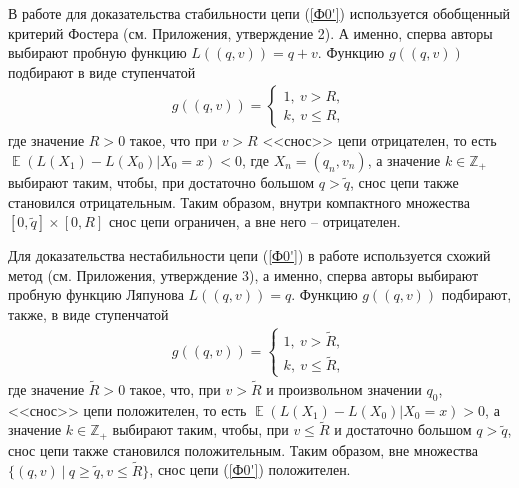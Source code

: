 \documentclass[10pt, reqno]{amsart}
\DeclareMathOperator*{\E}{\mathbb{E}}
\begin{document}
В работе \cite{Foss_original} для доказательства стабильности цепи (\ref{Ф0'}) используется обобщенный критерий Фостера (см. Приложения, утверждение 2). А именно, сперва авторы выбирают пробную функцию $L((q, v)) = q + v$. Функцию $g((q, v))$ подбирают в виде ступенчатой
\begin{align}
    g((q, v)) = \begin{cases}
    1,\: v > R,\\
    k,\: v \leq R,
    \end{cases}
    \label{step_function_g_stab}
\end{align}
где значение $R > 0$ такое, что при $v > R$ <<снос>> цепи отрицателен, то есть $\E(L(X_{1}) − L(X_{0}) | X_{0}=x) < 0$, где $X_{n} = (q_{n}, v_{n})$, а значение $k \in \mathbb{Z}_{+}$ выбирают таким, чтобы, при достаточно большом $q > \widetilde{q}$, снос цепи также становился отрицательным. Таким образом, внутри компактного множества $[0, \widetilde{q}] \times [0, R]$ снос цепи ограничен, а вне него -- отрицателен.

Для доказательства нестабильности цепи (\ref{Ф0'}) в работе \cite{Foss_original} используется схожий метод (см. Приложения, утверждение 3), а именно, сперва авторы выбирают пробную функцию Ляпунова $L((q, v)) = q$. Функцию $g((q, v))$ подбирают, также, в виде ступенчатой
\begin{align}
    g((q, v)) = \begin{cases}
    1,\: v > \widetilde{R},\\
    k,\: v \leq \widetilde{R},
    \end{cases}
    \label{step_function_g_instab}
\end{align}
где значение $\widetilde{R} > 0$ такое, что, при $v > \widetilde{R}$ и произвольном значении $q_{0}$, <<снос>> цепи положителен, то есть $\E(L(X_{1}) − L(X_{0}) | X_{0}=x) > 0$, а значение $k \in \mathbb{Z}_{+}$ выбирают таким, чтобы, при $v \leq \widetilde{R}$ и достаточно большом $q > \widetilde{q}$, снос цепи также становился положительным. Таким образом, вне множества $\{(q, v) \: | \: q \geq \widetilde{q}, v \leq \widetilde{R}\}$, снос цепи (\ref{Ф0'}) положителен.
\end{document}
